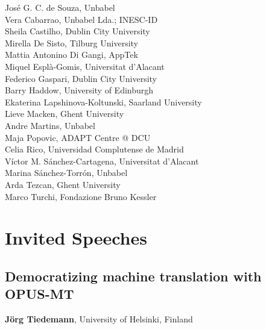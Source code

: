 \documentclass[a4paper,11pt,twoside]{book}
\newcommand{\newoddpage} {\clearpage
  \ifthenelse{\isodd{\value{page}}}{}
  {\thispagestyle{empty}\quad\newpage}}
\begin{document}
\noindent José G. C. de Souza, Unbabel\\
\noindent Vera Cabarrao, Unbabel Lda.; INESC-ID\\
\noindent Sheila Castilho, Dublin City University\\
\noindent Mirella De Sisto, Tilburg University\\
\noindent Mattia Antonino Di Gangi, AppTek\\
\noindent Miquel Esplà-Gomis, Universitat d'Alacant\\
\noindent Federico Gaspari, Dublin City University\\
\noindent Barry Haddow, University of Edinburgh\\
\noindent Ekaterina Lapshinova-Koltunski, Saarland University\\
\noindent Lieve Macken, Ghent University\\
\noindent Andre Martins, Unbabel\\
\noindent Maja Popovic, ADAPT Centre @ DCU\\
\noindent Celia Rico, Universidad Complutense de Madrid\\
\noindent Víctor M. Sánchez-Cartagena, Universitat d'Alacant\\
\noindent Marina Sánchez-Torrón, Unbabel\\
\noindent Arda Tezcan, Ghent University\\
\noindent Marco Turchi, Fondazione Bruno Kessler\\

\newoddpage
\mainmatter

\chapter*{Invited Speeches}
\label{invited}

\section*{Democratizing machine translation with OPUS-MT}
\textbf{Jörg Tiedemann}, University of Helsinki, Finland
\vspace{0.5cm}
\end{document}
